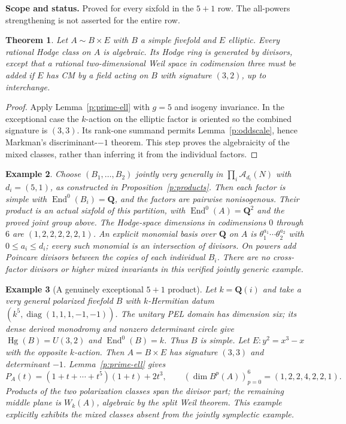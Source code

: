 \documentclass[10pt,reqno]{article}
\theoremstyle{emphasizedplain}
\newtheorem{theorem}{Theorem}[section]
\theoremstyle{emphasizeddefinition}
\newtheorem{example}[theorem]{Example}
\theoremstyle{emphasizeddefinition}
\DeclareMathOperator{\End}{End}
\DeclareMathOperator{\Hg}{Hg}
\newcommand{\Q}{\mathbf Q}
\newcommand{\status}[1]{%
  \par\nobreak\smallskip\noindent
  {\setlength{\fboxsep}{7pt}%
   \colorbox{ScopeBackground}{%
    \parbox{\dimexpr\linewidth-2\fboxsep\relax}{%
     \small\textbf{\textcolor{HeadingInk}{Scope and status.}} #1}}}%
  \par\nobreak\medskip}
\renewcommand{\small}{\fontsize{8.4}{10}\selectfont}
\begin{document}
\status{Proved for every sixfold in the $5+1$ row. The all-powers
strengthening is not asserted for the entire row.}
\begin{theorem}
Let $A\sim B\times E$ with $B$ a simple fivefold and $E$ elliptic.
Every rational Hodge class on $A$ is algebraic. Its Hodge ring is generated
by divisors, except that a rational two-dimensional Weil space in
codimension three must be added if $E$ has CM by a field acting on $B$
with signature $(3,2)$, up to interchange.
\end{theorem}
\begin{proof}
Apply Lemma~\ref{p:prime-ell} with $g=5$ and isogeny invariance.
In the exceptional case the $k$-action on the elliptic factor is oriented
so the combined signature is $(3,3)$. Its rank-one summand permits
Lemma~\ref{p:oddscale}, hence Markman's discriminant-$-1$ theorem.
This step proves the algebraicity of the mixed classes, rather than
inferring it from the individual factors.
\end{proof}
\begin{example}
Choose $(B_1,\ldots,B_{2})$ jointly very generally in
$\prod_i\mathcal A_{d_i}(N)$ with $d_i=(5,1)$,
as constructed in Proposition~\ref{p:products}. Then each factor is
simple with $\End^0(B_i)=\Q$, and the factors are pairwise nonisogenous.
Their product is an actual sixfold of this partition, with
$\End^0(A)=\Q^{2}$ and the proved joint group above.
The Hodge-space dimensions in codimensions $0$ through $6$ are
$(1,2,2,2,2,2,1)$.
An explicit monomial basis over $\Q$ on $A$ is
$\theta_1^{a_1}\cdots\theta_{2}^{a_{2}}$ with
$0\leq a_i\leq d_i$; every such monomial is an intersection of divisors.
On powers add Poincare divisors between the copies of each individual
$B_i$. There are no cross-factor divisors or higher mixed invariants in
this verified jointly generic example.
\end{example}
\begin{example}[A genuinely exceptional $5+1$ product]
Let $k=\Q(i)$ and take a very general polarized fivefold $B$ with
$k$-Hermitian datum $(k^5,\operatorname{diag}(1,1,1,-1,-1))$.
The unitary PEL domain has dimension six; its dense derived monodromy
and nonzero determinant circle give $\Hg(B)=U(3,2)$ and
$\End^0(B)=k$. Thus $B$ is simple. Let $E:y^2=x^3-x$ with the opposite
$k$-action. Then $A=B\times E$ has signature $(3,3)$ and determinant
$-1$. Lemma~\ref{p:prime-ell} gives
\[
 P_A(t)=(1+t+\cdots+t^5)(1+t)+2t^3,
 \qquad (\dim B^p(A))_{p=0}^6=(1,2,2,4,2,2,1).
\]
Products of the two polarization classes span the divisor part;
the remaining middle plane is $W_k(A)$, algebraic by the split Weil
theorem. This example explicitly exhibits the mixed classes absent
from the jointly symplectic example.
\end{example}
\end{document}
